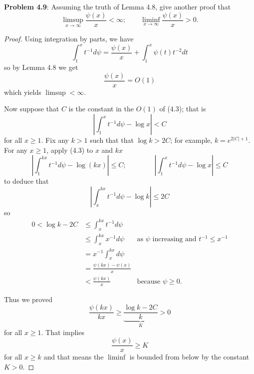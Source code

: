 \documentclass[12pt]{article}
\newcommand{\Abs}[1]{\left| #1 \right|}
\begin{document}
\fi

\textbf{Problem 4.9}: Assuming the truth of Lemma 4.8, give another proof that
$$\limsup_{x \rightarrow \infty} \frac{\psi(x)}{x} < \infty; \qquad \liminf_{x \rightarrow \infty} \frac{\psi(x)}{x} > 0.$$

\begin{proof}
Using integration by parts, we have
$$\int_1^x t^{-1} d\psi = \frac{\psi(x)}{x} + \int_1^x \psi(t) t^{-2} dt$$
so by Lemma 4.8 we get
$$\frac{\psi(x)}{x} = O(1)$$
which yields $\limsup < \infty$.

Now suppose that $C$ is the constant in the $O(1)$ of (4.3); that is
$$\Abs{ \int_1^x t^{-1} d\psi - \log x } < C$$
for all $x \geq 1$. Fix any $k > 1$ such that that $\log k > 2C$; for example, $k = e^{2|C| + 1}$. For any $x \geq 1$, apply (4.3) to $x$ and $kx$
$$\Abs{ \int_1^{kx} t^{-1} d\psi - \log (kx) } \leq C; \qquad \qquad \Abs{ \int_1^x t^{-1} d\psi - \log x } \leq C$$
to deduce that
$$\Abs{ \int_x^{kx} t^{-1} d\psi - \log k } \leq 2C$$
so
\begin{align*}
0 < \log k - 2C &\leq \int_x^{kx} t^{-1} d\psi\\
&\leq \int_x^{kx} x^{-1} d\psi &\text{as } \psi \text{ increasing and } t^{-1} \leq x^{-1}\\
&= x^{-1} \int_x^{kx} d\psi\\
&= \frac{\psi(kx) - \psi(x)}{x}\\
&< \frac{\psi(kx)}{x} &\text{because } \psi \geq 0.
\end{align*}

Thus we proved
$$\frac{\psi(kx)}{kx} \geq \underbrace{\frac{\log k - 2C}{k}}_{K} > 0$$
for all $x \geq 1$. That implies
$$\frac{\psi(x)}{x} \geq K$$
for all $x \geq k$ and that means the $\liminf$ is bounded from below by the constant $K > 0$.
\end{proof}

\unless\ifdefined\IsMainDocument
\end{document}
